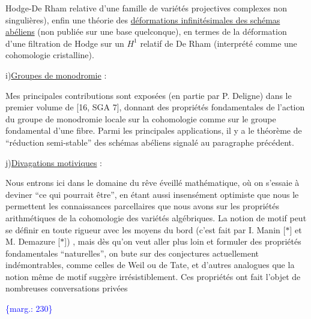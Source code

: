\documentclass[11pt]{article}
\newcommand{\scanpage}[1]{\par\bigskip\noindent{\small\sffamily[scan #1]}\par}
\newcommand{\mspage}[1]{{\small\sffamily[p.\,#1]}}
\newcommand{\margin}[1]{\textcolor{blue}{\{\textsf{marg.:} #1\}}}
\newcommand{\uline}[1]{\underline{#1}}
\begin{document}
Hodge-De Rham relative d'une famille de variétés
projectives complexes non singulières), enfin une
théorie des \uline{déformations infinitésimales des schémas}
\uline{abéliens} (non publiée sur une base quelconque), en
termes de la déformation d'une filtration de Hodge sur
un $H^{1}$ relatif de De Rham (interprété comme une
cohomologie cristalline).

i)\quad \uline{Groupes de monodromie} :

\qquad Mes principales contributions sont exposées
(en partie par P. Deligne) dans le premier volume
de [16, SGA 7], donnant des propriétés fondamentales
de l'action du groupe de monodromie locale sur la
cohomologie comme sur le groupe fondamental d'une fibre.
Parmi les principales applications, il y a le théorème
de ``réduction semi-stable'' des schémas abéliens signalé
au paragraphe précédent.

j)\quad \uline{Divagations motiviques} :

\qquad Nous entrons ici dans le domaine du rêve
éveillé mathématique, où on s'essaie à deviner ``ce qui
pourrait être'', en étant aussi insensément optimiste
que nous le permettent les connaissances parcellaires
que nous avons sur les propriétés arithmétiques de la
cohomologie des variétés algébriques. La notion de
motif peut se définir en toute rigueur avec les moyens
du bord (c'est fait par I. Manin [$*$] et M. Demazure [$*$]) ,
mais dès qu'on veut aller plus loin et formuler des
propriétés fondamentales ``naturelles'', on bute sur des
conjectures actuellement indémontrables, comme celles
de Weil ou de Tate, et d'autres analogues que la notion
même de motif suggère irrésistiblement. Ces propriétés
ont fait l'objet de nombreuses conversations privées

\margin{230}

\clearpage
\scanpage{119/231}
\mspage{. 18 .}
\end{document}
